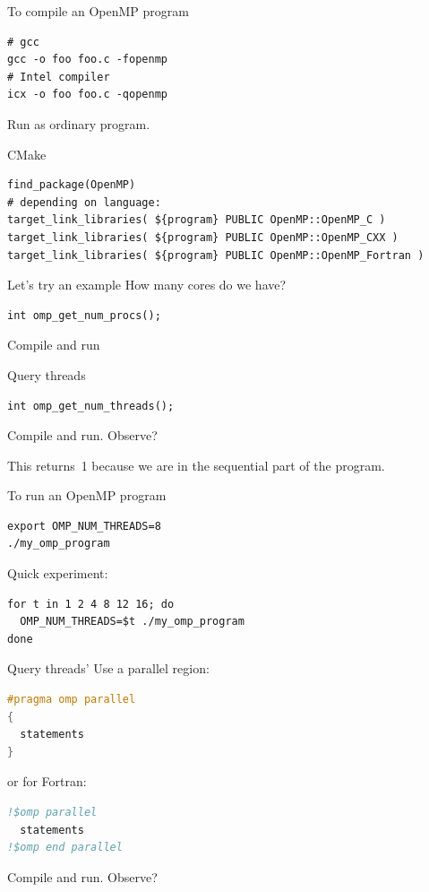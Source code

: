 \begin{numberedframe}{To compile an OpenMP program}
\begin{verbatim}
# gcc
gcc -o foo foo.c -fopenmp
# Intel compiler
icx -o foo foo.c -qopenmp
\end{verbatim}
Run as ordinary program.
\end{numberedframe}

\begin{numberedframe}{CMake}
\begin{lstlisting}
find_package(OpenMP)
# depending on language:
target_link_libraries( ${program} PUBLIC OpenMP::OpenMP_C )
target_link_libraries( ${program} PUBLIC OpenMP::OpenMP_CXX )
target_link_libraries( ${program} PUBLIC OpenMP::OpenMP_Fortran )
\end{lstlisting}
\end{numberedframe}

\begin{numberedframe}{Let's try an example}
  How many cores do we have?
\begin{lstlisting}[numbers=none]
int omp_get_num_procs();
\end{lstlisting}
Compile and run
\end{numberedframe}

\begin{numberedframe}{Query threads}
\begin{lstlisting}[numbers=none]
int omp_get_num_threads();
\end{lstlisting}
Compile and run. Observe?
\end{numberedframe}

\begin{instructor}
  This returns~1 because we are in the sequential part of the program.
\end{instructor}

\begin{numberedframe}{To run an OpenMP program}
\begin{lstlisting}[language=shell]
export OMP_NUM_THREADS=8
./my_omp_program
\end{lstlisting}
Quick experiment:
\begin{lstlisting}[language=shell]
for t in 1 2 4 8 12 16; do
  OMP_NUM_THREADS=$t ./my_omp_program
done
\end{lstlisting}
\end{numberedframe}

\begin{numberedframe}{Query threads'}
Use a parallel region:
\begin{lstlisting}[language=C]
#pragma omp parallel
{
  statements
}
\end{lstlisting}
or for Fortran:
\begin{lstlisting}[language=Fortran]
!$omp parallel
  statements
!$omp end parallel
\end{lstlisting}
Compile and run. Observe?
\end{numberedframe}

